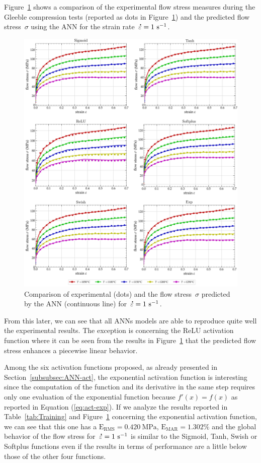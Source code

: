 \documentclass[algorithms,article,submit,pdftex,oneauthors]{Definitions/mdpi}
\DeclareRobustCommand{\mdot}[1]{\accentset{\mbox{\bfseries .}}{#1}}
\DeclareRobustCommand{\RMSE}{\text{E}_\text{RMS}}
\DeclareRobustCommand{\MARE}{\text{E}_\text{MAR}}
\DeclareRobustCommand{\ps}{\text{s}^{-1}}
\DeclareRobustCommand{\MPa}{\text{MPa}}
\begin{document}
Figure~\ref{fig:ANNFit} shows a comparison of the experimental flow stress measures during the Gleeble compression tests (reported as dots in Figure~\ref{fig:ANNFit}) and the predicted flow stress~$\sigma$ using the ANN for the strain rate~$\mdot{\varepsilon}=1~\ps$.
\begin{figure}[h!]
\centering
\includegraphics[width=0.95\columnwidth]{Figures/ANN-fit}
\caption{Comparison of experimental (dots) and the flow stress~$\sigma$ predicted by the ANN (continuous line) for~$\mdot{\varepsilon}=1~\ps$.}
\label{fig:ANNFit}
\end{figure}
From this later, we can see that all ANNs models are able to reproduce quite well the experimental results.
The exception is concerning the ReLU activation function where it can be seen from the results in Figure~\ref{fig:ANNFit} that the predicted flow stress enhances a piecewise linear behavior.

Among the six activation functions proposed, as already presented in Section~\ref{subsubsec:ANN-act}, the exponential activation function is interesting since the computation of the function and its derivative in the same step requires only one evaluation of the exponential function because $f'(x)=f(x)$ as reported in Equation (\ref{eq:act-exp}).
If we analyze the results reported in Table~\ref{tab:Training} and Figure~\ref{fig:ANNFit} concerning the exponential activation function, we can see that this one has a $\RMSE=0.420~\MPa$, $\MARE=1.302\%$ and the global behavior of the flow stress for~$\mdot{\varepsilon}=1~\ps$ is similar to the Sigmoid, Tanh, Swish or Softplus functions even if the results in terms of performance are a little below those of the other four functions.
\end{document}
